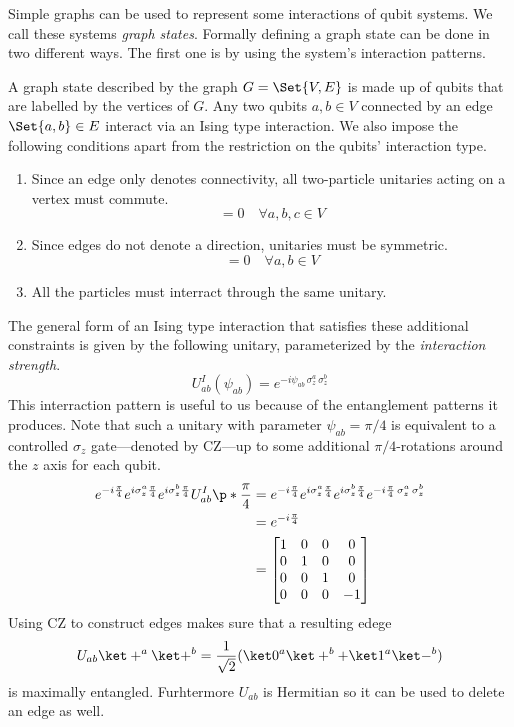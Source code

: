 Simple graphs can be used to represent some interactions of qubit systems. We call these systems \emph{graph states}. Formally defining a graph state can be done in two different ways. The first one is by using the system's interaction patterns. 

A graph state described by the graph \(G = \Set{V, E}\) is made up of qubits that are labelled by the vertices of \(G\). Any two qubits \(a,b\in V\) connected by an edge \(\Set{a,b} \in E\) interact via an Ising type interaction. We also impose the following conditions apart from the restriction on the qubits' interaction type.
\begin{enumerate}
  \item Since an edge only denotes connectivity, all two-particle unitaries acting on a vertex must commute.
  \begin{equation}
    [U_{ab}, U_{bc}] = 0 \quad \forall a, b, c \in V
  \end{equation}
  \item Since edges do not denote a direction, unitaries must be symmetric.
  \begin{equation}
    [U_{ab}, U_{ba}] = 0 \quad \forall a, b \in V
  \end{equation}
  \item All the particles must interract through the same unitary.
\end{enumerate}
The general form of an Ising type interaction that satisfies these additional constraints is given by the following unitary, parameterized by the \emph{interaction strength}.
\begin{equation}
  U_{ab}^I(\psi_{ab}) = e^{-i \psi_{ab} \, \sigma_z^a \, \sigma_z^b}
\end{equation}
This interraction pattern is useful to us because of the entanglement patterns it produces. Note that such a unitary with parameter \(\psi_{ab} = \pi/4\) is equivalent to a controlled \(\sigma_z\) gate---denoted by CZ---up to some additional \(\pi/4\)-rotations around the \(z\) axis for each qubit.
\begin{equation}
\begin{aligned}
  e^{-i\frac{\pi}{4}} e^{i\sigma_z^a\frac{\pi}{4}} e^{i\sigma_z^b\frac{\pi}{4}} U^I_{ab}\p*{\frac{\pi}{4}} &= e^{-i\frac{\pi}{4}} e^{i\sigma_z^a\frac{\pi}{4}} e^{i\sigma_z^b\frac{\pi}{4}} e^{-i \frac{\pi}{4} \, \sigma_z^a \, \sigma_z^b}\\
  &= e^{-i\frac{\pi}{4}}\\
  &= \begin{bmatrix}
    1 & 0 & 0 & 0 \\
    0 & 1 & 0 & 0 \\
    0 & 0 & 1 & 0 \\
    0 & 0 & 0 & -1
  \end{bmatrix}
\end{aligned}
\end{equation}
Using CZ to construct edges makes sure that a resulting edege
\begin{equation}
  U_{ab}\ket+^a\ket+^b = \frac{1}{\sqrt2}(\ket0^a\ket+^b + \ket1^a\ket-^b) 
\end{equation}
is maximally entangled. Furhtermore \(U_{ab}\)\/ is Hermitian so it can be used to delete an edge as well.

